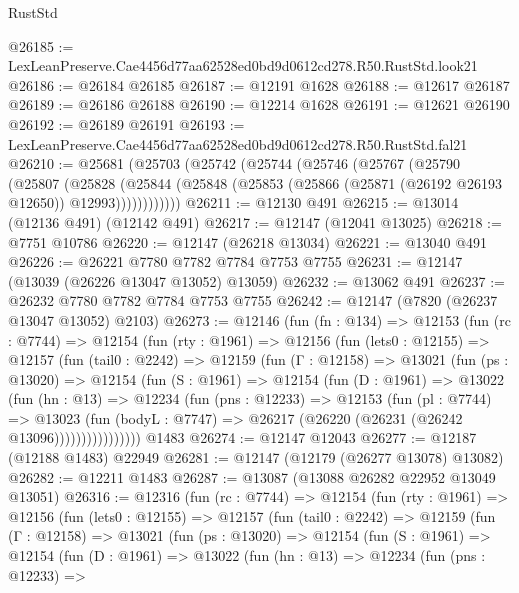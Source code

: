 \begin{lexlean}{RustStd}
\begin{coremodule}
@26185 := LexLeanPreserve.Cae4456d77aa62528ed0bd9d0612cd278.R50.RustStd.look21
@26186 := @26184 @26185
@26187 := @12191 @1628
@26188 := @12617 @26187
@26189 := @26186 @26188
@26190 := @12214 @1628
@26191 := @12621 @26190
@26192 := @26189 @26191
@26193 := LexLeanPreserve.Cae4456d77aa62528ed0bd9d0612cd278.R50.RustStd.fal21
@26210 := @25681
    (@25703
      (@25742
        (@25744
          (@25746
            (@25767
              (@25790
                (@25807
                  (@25828
                    (@25844
                      (@25848 (@25853 (@25866 (@25871 (@26192 @26193 @12650)) @12993))))))))))))
@26211 := @12130 @491
@26215 := @13014 (@12136 @491) (@12142 @491)
@26217 := @12147 (@12041 @13025)
@26218 := @7751 @10786
@26220 := @12147 (@26218 @13034)
@26221 := @13040 @491
@26226 := @26221 @7780 @7782 @7784 @7753 @7755
@26231 := @12147 (@13039 (@26226 @13047 @13052) @13059)
@26232 := @13062 @491
@26237 := @26232 @7780 @7782 @7784 @7753 @7755
@26242 := @12147 (@7820 (@26237 @13047 @13052) @2103)
@26273 := @12146
    (fun (fn : @134) =>
    @12153
      (fun (rc : @7744) =>
      @12154
        (fun (rty : @1961) =>
        @12156
          (fun (lets0 : @12155) =>
          @12157
            (fun (tail0 : @2242) =>
            @12159
              (fun (Γ : @12158) =>
              @13021
                (fun (ps : @13020) =>
                @12154
                  (fun (S : @1961) =>
                  @12154
                    (fun (D : @1961) =>
                    @13022
                      (fun (hn : @13) =>
                      @12234
                        (fun (pns : @12233) =>
                        @12153
                          (fun (pl : @7744) =>
                          @13023
                            (fun (bodyL : @7747) =>
                            @26217 (@26220 (@26231 (@26242 @13096))))))))))))))))
    @1483
@26274 := @12147 @12043
@26277 := @12187 (@12188 @1483) @22949
@26281 := @12147 (@12179 (@26277 @13078) @13082)
@26282 := @12211 @1483
@26287 := @13087 (@13088 @26282 @22952 @13049 @13051)
@26316 := @12316
    (fun (rc : @7744) =>
    @12154
      (fun (rty : @1961) =>
      @12156
        (fun (lets0 : @12155) =>
        @12157
          (fun (tail0 : @2242) =>
          @12159
            (fun (Γ : @12158) =>
            @13021
              (fun (ps : @13020) =>
              @12154
                (fun (S : @1961) =>
                @12154
                  (fun (D : @1961) =>
                  @13022
                    (fun (hn : @13) =>
                    @12234
                      (fun (pns : @12233) =>

\end{coremodule}
\end{lexlean}
